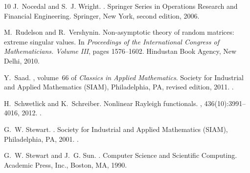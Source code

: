 \documentclass[a4paper,11pt]{article}
\begin{document}
\begin{thebibliography}{10}
J.~Nocedal and S.~J. Wright.
.
\newblock Springer Series in Operations Research and Financial Engineering. Springer, New York, second edition, 2006.

M.~Rudelson and R.~Vershynin.
\newblock Non-asymptotic theory of random matrices: extreme singular values.
\newblock In {\em Proceedings of the {I}nternational {C}ongress of {M}athematicians. {V}olume {III}}, pages 1576--1602. Hindustan Book Agency, New Delhi, 2010.

Y.~Saad.
, volume~66 of {\em Classics in Applied Mathematics}.
\newblock Society for Industrial and Applied Mathematics (SIAM), Philadelphia, PA, revised edition, 2011.
\newblock \href {https://doi.org/10.1137/1.9781611970739} {}.

H.~Schwetlick and K.~Schreiber.
\newblock Nonlinear {R}ayleigh functionals.
, 436(10):3991--4016, 2012.
\newblock \href {https://doi.org/10.1016/j.laa.2010.06.048} {}.

G.~W. Stewart.
.
\newblock Society for Industrial and Applied Mathematics (SIAM), Philadelphia, PA, 2001.
\newblock \href {https://doi.org/10.1137/1.9780898718058} {}.

G.~W. Stewart and J.~G. Sun.
.
\newblock Computer Science and Scientific Computing. Academic Press, Inc., Boston, MA, 1990.

\end{thebibliography}


\end{document}
